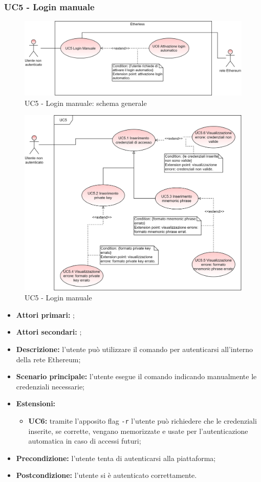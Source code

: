 \subsubsection{UC5 - Login manuale}
\begin{figure}[H]
	\centering
	\includegraphics[scale=\ucs]{./res/img/UC5G.png}
	\caption {UC5 - Login manuale: schema generale}
\end{figure}
\begin{figure}[H]
	\centering
	\includegraphics[scale=\ucs]{./res/img/UC5.png}
	\caption {UC5 - Login manuale}
\end{figure}
\begin{itemize}
	\item \textbf{Attori primari:} \una{};
	\item \textbf{Attori secondari:} \re{};
	\item \textbf{Descrizione:} l’utente può utilizzare il comando \login{} per autenticarsi all’interno della rete Ethereum; 
	\item \textbf{Scenario principale:} l'utente esegue il comando \login{} indicando manualmente le credenziali necessarie; 
	\item \textbf{Estensioni:} 
	\begin{itemize}
		\item \textbf{UC6:} tramite l’apposito flag \texttt{-r} l’utente può richiedere che le credenziali inserite, se corrette, vengano memorizzate e usate per l'autenticazione automatica in caso di accessi futuri;
	\end{itemize}
	\item \textbf{Precondizione:} l’utente tenta di autenticarsi alla piattaforma;
	\item \textbf{Postcondizione:} l’utente si è autenticato correttamente.
\end{itemize}